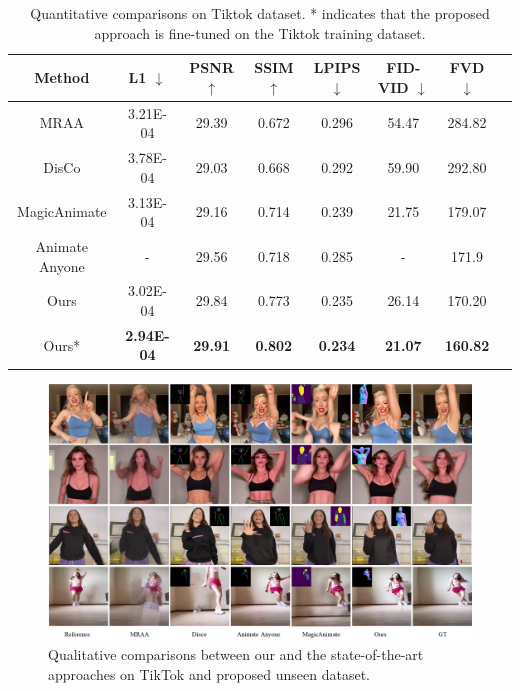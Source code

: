 \begin{table}[!t]
\centering
\begin{tabular}{c|cccc|ccc}
\hline
Method          & L1 $\downarrow$ & PSNR $\uparrow$ & SSIM $\uparrow$ & LPIPS $\downarrow$  & FID-VID $\downarrow$ & FVD $\downarrow$ \\ \hline
MRAA  & 3.21E-04        & 29.39           & 0.672           & 0.296              & 54.47                           & 284.82           \\
DisCo             & 3.78E-04            & 29.03             & 0.668             & 0.292                            & 59.90                  & 292.80              \\
MagicAnimate  & 3.13E-04    & 29.16           & 0.714           & 0.239              & 21.75                          & 179.07           \\
Animate Anyone  & -            & 29.56             & 0.718             & 0.285                & -                                & 171.9              \\
Ours & 3.02E-04            & 29.84             & 0.773            & 0.235                             & 26.14                  & 170.20   \\
Ours*  & \textbf{2.94E-04}            & \textbf{29.91}             & \textbf{0.802}            & \textbf{0.234}                             & \textbf{21.07}                  & \textbf{160.82}         \\\hline
\end{tabular} 
\vspace{1mm}
\caption{Quantitative comparisons on Tiktok dataset.
* indicates that the proposed approach is fine-tuned on the Tiktok training dataset.}
\vspace{-4mm}
\label{tab:quantitative_tiktok}
\end{table}

\begin{figure}[!t]
  \centering
  \includegraphics[width=\textwidth]{fig/qualitative_comparisons.png}
  \caption[]{Qualitative comparisons between our and the state-of-the-art approaches on TikTok and proposed unseen dataset.}
  \vspace{-4mm}
  \label{fig:qualitative_comparisons}
\end{figure}

